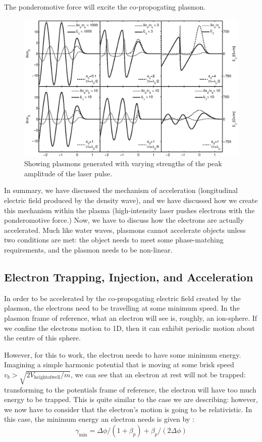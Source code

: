 \documentclass[12pt, titlepage]{article}
\begin{document}
   The ponderomotive force will excite the co-propogating plasmon. 
   \begin{figure}[h!]
       \centering
       \includegraphics[width = .8\linewidth]{../figures/densityandewave.pdf}
       \caption{Showing plasmons generated with varying strengths of the peak
       amplitude of the laser pulse.\cite{genothesis}}
   \end{figure}
   In summary, we have discussed the mechanism of acceleration (longitudinal
   electric field produced by the density wave), and we have discussed how we
   create this mechanism within the plasma (high-intensity laser pushes
   electrons with the ponderomotive force.) Now, we have to discuss how the
   electrons are actually accelerated. Much like water waves, plasmons cannot
   accelerate objects unless two conditions are met\cite{PhysRevLett.113.085001}: the object needs to meet
   some phase-matching requirements, and the plasmon needs to be non-linear. 


   \subsection{Electron Trapping, Injection, and Acceleration}

    In order to be accelerated by the co-propogating electric field created by the
    plasmon, the electrons need to be travelling at some minimum speed. In the
    plasmon frame of reference, what an electron will see is, roughly, an
    ion-sphere. If we confine the electrons motion to 1D, then it can exhibit
    periodic motion about the centre of this sphere. 

    However, for this to work, the electron needs to have some minimum energy.
    Imagining a simple harmonic potential that is moving at some brisk speed $v_b >
    \sqrt{2 V_\mathrm{height of well}/m} $, we can see that an electron at rest will
    not be trapped: transforming to the potentials frame of reference, the electron
    will have too much energy to be trapped.
    This is quite similar to the case we are describing: however, we now have to
    consider that the electron's motion is going to be relativistic. In this case,
    the minimum energy an electron needs is given by :
    \begin{equation}
        \gamma_\mathrm{min} = \Delta \phi / (1+\beta_p) + \beta_p/(2 \Delta \phi)
    \end{equation}
\end{document}
